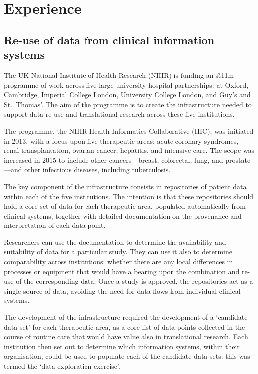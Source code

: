 \section{Experience}

\subsection{Re-use of data from clinical information systems}

The UK National Institute of Health Research (NIHR) is funding an
\pounds 11m programme of work across five large university-hospital
partnerships: at Oxford, Cambridge, Imperial College London,
University College London, and Guy's and St.~Thomas'.  The aim of the
programme is to create the infrastructure needed to support data
re-use and translational research across these five institutions.

The programme, the NIHR Health Informatics Collaborative (HIC), was
initiated in 2013, with a focus upon five therapeutic areas: acute
coronary syndromes, renal transplantation, ovarian cancer, hepatitis,
and intensive care.  The scope was increased in 2015 to include other
cancers---breast, colorectal, lung, and prostate---and other
infectious diseases, including tuberculosis.

The key component of the infrastructure consists in repositories of
patient data within each of the five institutions.  The intention is
that these repositories should hold a core set of data for each
therapeutic area, populated automatically from clinical systems,
together with detailed documentation on the provenance and
interpretation of each data point.  

Researchers can use the documentation to determine the availability
and suitability of data for a particular study.  They can use it also
to determine comparability across institutions: whether there are any
local differences in processes or equipment that would have a bearing
upon the combination and re-use of the corresponding data.  Once a
study is approved, the repositories act as a single source of data,
avoiding the need for data flows from individual clinical systems.

The development of the infrastructure required the development of a
`candidate data set' for each therapeutic area, as a core list of data
points collected in the course of routine care that would have value
also in translational research.  Each institution then set out to
determine which information systems, within their organisation, could
be used to populate each of the candidate data sets: this was termed
the `data exploration exercise'.

